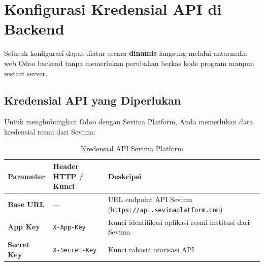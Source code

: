 \documentclass[11pt,a4paper]{article}
\begin{document}
\section{Konfigurasi Kredensial API di Backend}

Seluruh konfigurasi dapat diatur secara \textbf{dinamis} langsung melalui antarmuka web Odoo backend tanpa memerlukan perubahan berkas kode program maupun restart server.

\subsection{Kredensial API yang Diperlukan}
Untuk menghubungkan Odoo dengan Sevima Platform, Anda memerlukan data kredensial resmi dari Sevima:
\begin{table}[h!]
\centering
\small
\begin{tabularx}{\textwidth}{l p{4.5cm} X}
\toprule
\textbf{Parameter} & \textbf{Header HTTP / Kunci} & \textbf{Deskripsi} \\
\midrule
\textbf{Base URL} & — & URL endpoint API Sevima (\texttt{https://api.sevimaplatform.com}) \\
\textbf{App Key} & \texttt{X-App-Key} & Kunci identifikasi aplikasi resmi institusi dari Sevima \\
\textbf{Secret Key} & \texttt{X-Secret-Key} & Kunci rahasia otorisasi API \\
\bottomrule
\end{tabularx}
\caption{Kredensial API Sevima Platform}
\end{table}
\end{document}
